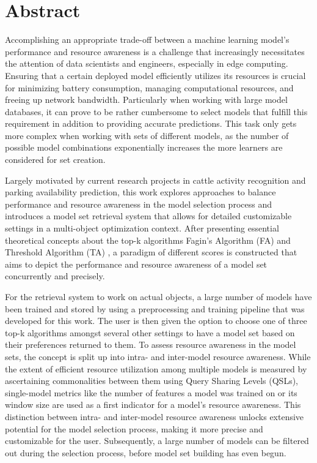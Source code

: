 \chapter*{Abstract}
 
 
 Accomplishing an appropriate trade-off between a machine learning model's performance and resource awareness is a challenge that increasingly necessitates the attention of data scientists and engineers, especially in edge computing. Ensuring that a certain deployed model efficiently utilizes its resources is crucial for minimizing battery consumption, managing computational resources, and freeing up network bandwidth. Particularly when working with large model databases, it can prove to be rather cumbersome to select models that fulfill this requirement in addition to providing accurate predictions. This task only gets more complex when working with sets of different models, as the number of possible model combinations exponentially increases the more learners are considered for set creation.
  
 Largely motivated by current research projects in cattle activity recognition and parking availability prediction, this work explores approaches to balance performance and resource awareness in the model selection process and introduces a model set retrieval system that allows for detailed customizable settings in a multi-object optimization context. After presenting essential theoretical concepts about the top-k algorithms Fagin's Algorithm (FA) \cite{fagin1999} and Threshold Algorithm (TA) \cite{fagin2002a}, a paradigm of different scores is constructed that aims to depict the performance and resource awareness of a model set concurrently and precisely. 
 
  For the retrieval system to work on actual objects, a large number of models have been trained and stored by using a preprocessing and training pipeline that was developed for this work. The user is then given the option to choose one of three top-k algorithms amongst several other settings to have a model set based on their preferences returned to them. To assess resource awareness in the model sets, the concept is split up into intra- and inter-model resource awareness. While the extent of efficient resource utilization among multiple models is measured by ascertaining commonalities between them using Query Sharing Levels (QSLs), single-model metrics like the number of features a model was trained on or its window size are used as a first indicator for a model's resource awareness. This distinction between intra- and inter-model resource awareness unlocks extensive potential for the model selection process, making it more precise and customizable for the user. Subsequently, a large number of models can be filtered out during the selection process, before model set building has even begun.
 
